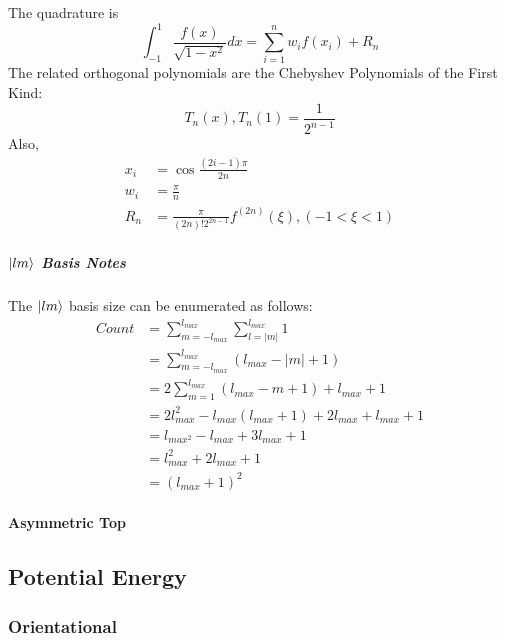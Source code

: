 \documentclass{revtex4-1}
\begin{document}
The quadrature is
\begin{equation}
\int_{-1}^{1}\frac{f(x)}{\sqrt{1-x^{2}}}dx = \sum_{i=1}^{n}w_{i}f(x_{i}) + R_{n}
\end{equation}
The related orthogonal polynomials are the Chebyshev Polynomials of the First Kind:
\begin{equation}
T_{n}(x),T_{n}(1)=\frac{1}{2^{n-1}}
\end{equation}
Also,
\begin{align}
x_{i} &= \cos{\frac{(2i-1)\pi}{2n}}\\
w_{i} &= \frac{\pi}{n}\\
R_{n} &= \frac{\pi}{(2n)!2^{2n-1}}f^{(2n)}(\xi), (-1<\xi<1)
\end{align}

\subparagraph{$\ket{lm}$ Basis Notes}\label{S:lmBasis}

The $\ket{lm}$ basis size can be enumerated as follows:
\begin{align}
Count  	&= \sum_{m=-l_{max}}^{l_{max}} \sum_{l=|m|}^{l_{max}}1 \\
		&= \sum_{m=-l_{max}}^{l_{max}} (l_{max} - |m| + 1) \nonumber \\
		&= 2 \sum_{m=1}^{l_{max}}(l_{max} - m + 1) + l_{max} + 1 \nonumber \\
		&= 2l_{max}^{2} - l_{max}(l_{max} + 1) + 2l_{max} + l_{max} + 1 \nonumber \\
		&= l_{max^{2}} - l_{max} + 3l_{max} + 1 \nonumber \\
		&= l_{max}^{2} + 2l_{max} + 1 \nonumber \\
		&= (l_{max} + 1)^{2}
\end{align}
												  
												  
\paragraph{Asymmetric Top}\label{S:AsRotBS} 

\subsection{Potential Energy}\label{S:PE}
\subsubsection{Orientational}\label{S:PEOri}
\end{document}
